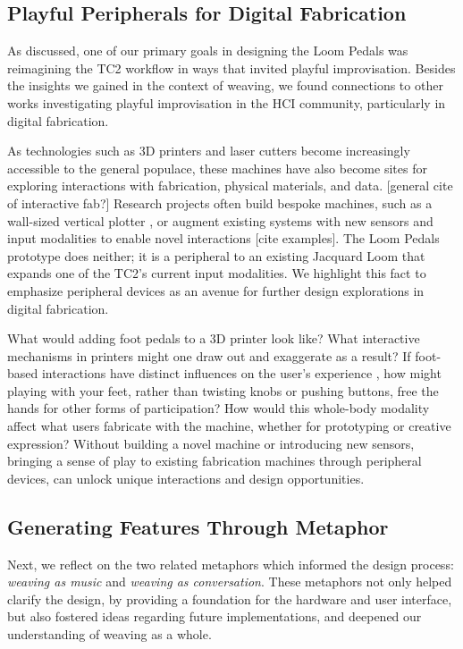 \subsection{Playful Peripherals for Digital Fabrication}

As discussed, one of our primary goals in designing the Loom Pedals was reimagining the TC2 workflow in ways that invited playful improvisation. Besides the insights we gained in the context of weaving, we found connections to other works investigating playful improvisation in the HCI community, particularly in digital fabrication. 

As technologies such as 3D printers and laser cutters become increasingly accessible to the general populace, these machines have also become sites for exploring interactions with fabrication, physical materials, and data. [general cite of interactive fab?] Research projects often build bespoke machines, such as a wall-sized vertical plotter \cite{cheng_duco_2021}, or augment existing systems with new sensors and input modalities to enable novel interactions [cite examples]. The Loom Pedals prototype does neither; it is a peripheral to an existing Jacquard Loom that expands one of the TC2's current input modalities. We highlight this fact to emphasize peripheral devices as an avenue for further design explorations in digital fabrication.

What would adding foot pedals to a 3D printer look like? What interactive mechanisms in printers might one draw out and exaggerate as a result? If foot-based interactions have distinct influences on the user's experience \cite{velloso_feet_2015}, how might playing with your feet, rather than twisting knobs or pushing buttons, free the hands for other forms of participation? How would this whole-body modality affect what users fabricate with the machine, whether for prototyping or creative expression? Without building a novel machine or introducing new sensors, bringing a sense of play to existing fabrication machines through peripheral devices, can unlock unique interactions and design opportunities.

\subsection{Generating Features Through Metaphor}

Next, we reflect on the two related metaphors which informed the design process: \textit{weaving as music} and \textit{weaving as conversation}. These metaphors not only helped clarify the design, by providing a foundation for the hardware and user interface, but also fostered ideas regarding future implementations, and deepened our understanding of weaving as a whole. 

